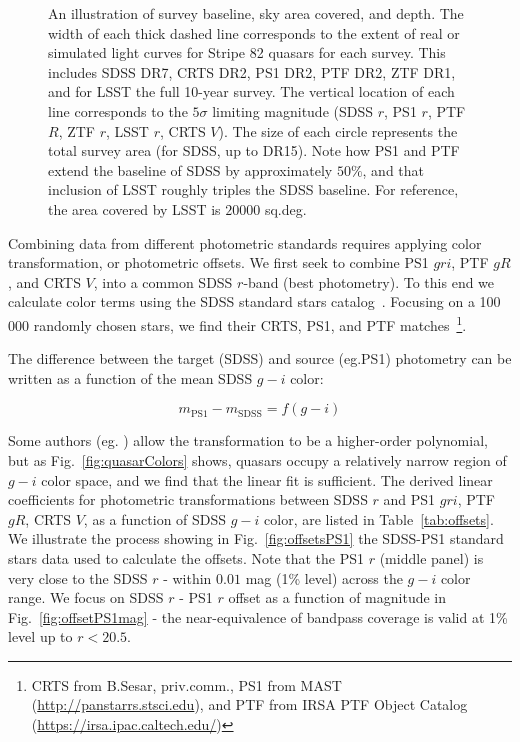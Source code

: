 \documentclass[twocolumn]{aastex62}
\begin{document}
\begin{figure*} 
	\caption{An illustration of survey baseline, sky area covered, and depth. The width of each thick dashed line corresponds to the extent of real or simulated light curves for Stripe 82 quasars for each survey. This includes SDSS DR7, CRTS DR2, PS1 DR2, PTF DR2, ZTF DR1, and for LSST the full 10-year survey. The vertical location of each line corresponds to the $5\sigma$ limiting magnitude (SDSS $r$, PS1 $r$, PTF $R$, ZTF $r$, LSST $r$, CRTS $V$). The size of each circle represents the total survey area (for SDSS, up to DR15).  Note how PS1 and PTF extend the baseline of SDSS by approximately $50\%$, and that inclusion of LSST roughly triples the SDSS baseline. For reference, the area covered by LSST is $20 000$ sq.deg.}
	\label{fig:lc_extent}
\end{figure*} 


Combining data from different photometric standards requires applying color transformation, or photometric offsets. We first seek to combine PS1 $gri$,  PTF $gR$, and CRTS $V$, into a common SDSS $r$-band (best photometry). To this end we calculate  color terms using the SDSS standard stars catalog~\citep{ivezic2007}. Focusing on a 100 000 randomly chosen stars, we find their CRTS, PS1, and PTF matches~\footnote{CRTS from B.Sesar, priv.comm., PS1 from MAST (\url{http://panstarrs.stsci.edu}), and PTF from IRSA PTF Object Catalog (\url{https://irsa.ipac.caltech.edu/})}. 

The difference  between the target (SDSS) and source (eg.PS1) photometry can be written as a function of the mean SDSS $g-i$ color: 

\begin{equation}
m_{\mathrm{PS1}} - m_{\mathrm{SDSS}} = f(g-i)
\end{equation}

Some authors (eg. \citealt{li2018}) allow the transformation to be a higher-order polynomial, but as Fig.~\ref{fig:quasarColors} shows, quasars occupy a relatively narrow region of $g-i$ color space, and we find that the linear fit is sufficient. The derived linear coefficients for photometric transformations between SDSS $r$ and PS1 $gri$, PTF $gR$, CRTS $V$,  as a function of SDSS $g-i$ color, are listed in Table~\ref{tab:offsets}. We illustrate the process showing in Fig.~\ref{fig:offsetsPS1} the SDSS-PS1 standard stars data used to calculate the offsets. Note that the PS1 $r$ (middle panel) is very close to the SDSS $r$ - within  $0.01$ mag (1\% level) across the $g-i$ color range. We focus on SDSS $r$ - PS1 $r$ offset as a function of magnitude in Fig.~\ref{fig:offsetPS1mag} - the near-equivalence of bandpass coverage is valid at 1\% level up to $r < 20.5$.  
\end{document}
